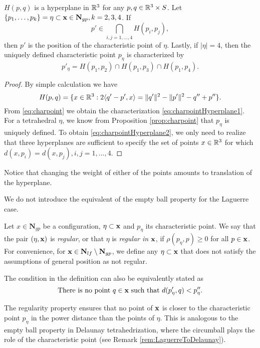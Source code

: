 \begin{proposition}\label{prop:charpointHyperplane} $H(p,q)$ is a hyperplane in ${\mathbb R^3}$ for any $p,q\in{\mathbb R^3}\times S$. Let $\{p_1,\dots,p_k\} =\eta\subset{\mathbf{x}}\in \mathbf N_{gp}, k=2,3,4$. If 
	\begin{equation}\label{eq:charpointHyperplane1}p'\in\bigcap_{i,j=1,\dots,4} H(p_i,p_j),\end{equation}
	then $p'$ is the position of the characteristic point of $\eta$. Lastly, if $|\eta|=4$, then the uniquely defined characteristic point $p_\eta$ is characterized by
	\begin{equation}\label{eq:charpointHyperplane2}p'_\eta = H(p_1,p_2)\cap H(p_1,p_3) \cap H(p_1,p_4).\end{equation}
\end{proposition}
\begin{proof}
	By simple calculation we have
	$$H(p,q) = \{x \in {\mathbb R^3}: 2 \langle q'-p',x \rangle  = \|q'\|^2 - \|p'\|^2  - q'' + p''\}.$$
	From \eqref{eq:charpoint} we obtain the characterization \eqref{eq:charpointHyperplane1}. 
	For a tetrahedral $\eta$, we know from Proposition \ref{prop:charpoint} that $p_\eta$ is uniquely defined. To obtain \eqref{eq:charpointHyperplane2}, we only need to realize that three hyperplanes are sufficient to specify the set of points $x\in {\mathbb R^3}$ for which $d(x,p_i)=d(x,p_j), i,j=1,\dots,4$.
\end{proof}

Notice that changing the weight of either of the points amounts to translation of the hyperplane. \newline

\noindent We do not introduce the equivalent of the empty ball property for the Laguerre case.


\begin{definition}\label{def:regular}
	Let $x\in \mathbf N_{gp}$ be a configuration, $\eta \subset {\mathbf{x}}$ and $p_\eta$ its characteristic point. We say that the pair $(\eta,{\mathbf{x}})$ is \textit{regular}, or that $\eta$ is \textit{regular in} ${\mathbf{x}}$, if $\rho(p_\eta,p)\geq 0$ for all $p\in{\mathbf{x}}$.	
	For convenience, for ${\mathbf{x}} \in \mathbf N_{lf}\setminus \mathbf N_{gp}$, we define any $\eta\subset {\mathbf{x}}$ that does not satisfy the assumptions of general position as not regular.
\end{definition}
The condition in the definition can also be equivalently stated as 
$$\text{There is no point } q\in{\mathbf{x}} \text{ such that } d(p'_\eta,q)<p''_\eta.$$

The regularity property ensures that no point of ${\mathbf{x}}$ is closer to the characteristic point $p_\eta$ in the power distance than the points of $\eta$. This is analogous to the empty ball property in Delaunay tetrahedrization, where the circumball plays the role of the characteristic point (see Remark \ref{rem:LaguerreToDelaunay}).




